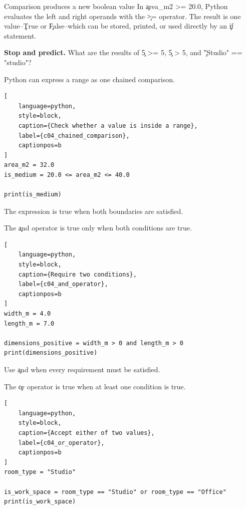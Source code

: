 \begin{SyntaxBox}{Comparison produces a new boolean value}
In \c{area_m2 >= 20.0}, Python evaluates the left and right operands with the
\c{>=} operator. The result is one value--\c{True} or \c{False}--which can be
stored, printed, or used directly by an \c{if} statement.
\end{SyntaxBox}

\begin{NoteBox}
\textbf{Stop and predict.} What are the results of \c{5 >= 5}, \c{5 > 5}, and
\c{"Studio" == "studio"}?
\end{NoteBox}


Python can express a range as one chained comparison.

\begin{lstlisting}[
    language=python,
    style=block,
    caption={Check whether a value is inside a range},
    label={c04_chained_comparison},
    captionpos=b
]
area_m2 = 32.0
is_medium = 20.0 <= area_m2 <= 40.0

print(is_medium)
\end{lstlisting}

The expression is true when both boundaries are satisfied.


The \c{and} operator is true only when both conditions are true.

\begin{lstlisting}[
    language=python,
    style=block,
    caption={Require two conditions},
    label={c04_and_operator},
    captionpos=b
]
width_m = 4.0
length_m = 7.0

dimensions_positive = width_m > 0 and length_m > 0
print(dimensions_positive)
\end{lstlisting}

Use \c{and} when every requirement must be satisfied.


The \c{or} operator is true when at least one condition is true.

\begin{lstlisting}[
    language=python,
    style=block,
    caption={Accept either of two values},
    label={c04_or_operator},
    captionpos=b
]
room_type = "Studio"

is_work_space = room_type == "Studio" or room_type == "Office"
print(is_work_space)
\end{lstlisting}

